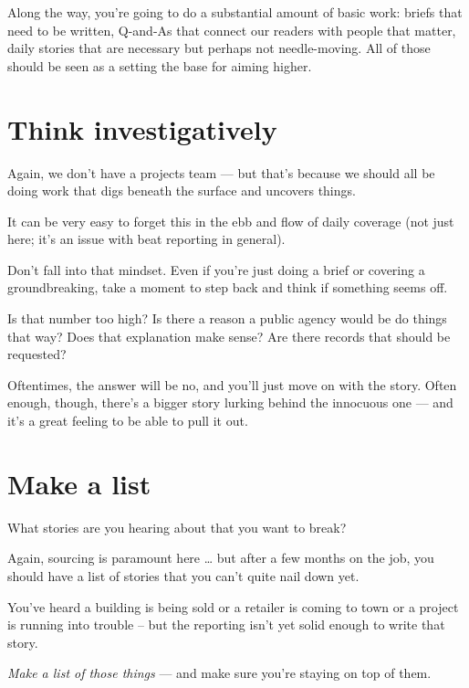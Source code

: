 \documentclass[
  11pt,
  american,
  letterpaperpaper,
  extrafontsizes,onecolumn,openright
  ]{memoir}
\newlength{\rf}
\begin{document}
Along the way, you're going to do a substantial amount of basic work: briefs that need to be written, Q-and-As that connect our readers with people that matter, daily stories that are necessary but perhaps not needle-moving. All of those should be seen as a setting the base for aiming higher.

\hypertarget{think-investigatively}{%
\section*{Think investigatively}\label{think-investigatively}}

Again, we don't have a projects team --- but that's because we should all be doing work that digs beneath the surface and uncovers things.

It can be very easy to forget this in the ebb and flow of daily coverage (not just here; it's an issue with beat reporting in general).

Don't fall into that mindset. Even if you're just doing a brief or covering a groundbreaking, take a moment to step back and think if something seems off.

Is that number too high? Is there a reason a public agency would be do things that way? Does that explanation make sense? Are there records that should be requested?

Oftentimes, the answer will be no, and you'll just move on with the story. Often enough, though, there's a bigger story lurking behind the innocuous one --- and it's a great feeling to be able to pull it out.

\hypertarget{make-a-list}{%
\section*{Make a list}\label{make-a-list}}

What stories are you hearing about that you want to break?

Again, sourcing is paramount here \ldots{} but after a few months on the job, you should have a list of stories that you can't quite nail down yet.

You've heard a building is being sold or a retailer is coming to town or a project is running into trouble -- but the reporting isn't yet solid enough to write that story.

\emph{Make a list of those things} --- and make sure you're staying on top of them.
\end{document}
